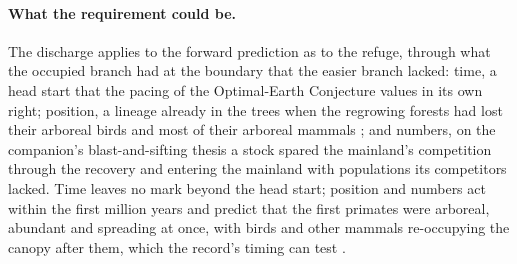 \documentclass[11pt]{article}
\theoremstyle{definition}
\begin{document}
\paragraph{What the requirement could be.} The discharge applies to the forward prediction as to the refuge, through what the occupied branch had at the boundary that the easier branch lacked: time, a head start that the pacing of the Optimal-Earth Conjecture values in its own right; position, a lineage already in the trees when the regrowing forests had lost their arboreal birds and most of their arboreal mammals \cite{Field2018forestcollapse, Hughes2021substrate}; and numbers, on the companion's blast-and-sifting thesis a stock spared the mainland's competition through the recovery and entering the mainland with populations its competitors lacked. Time leaves no mark beyond the head start; position and numbers act within the first million years and predict that the first primates were arboreal, abundant and spreading at once, with birds and other mammals re-occupying the canopy after them, which the record's timing can test \cite{Nexus}.

\end{document}
